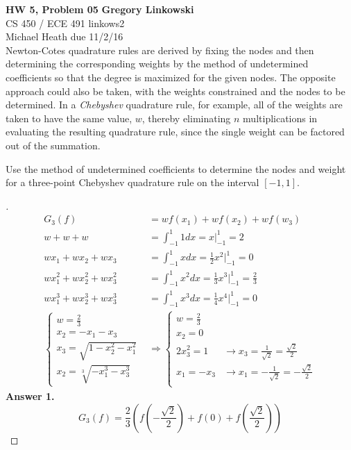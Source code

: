\documentclass[12pt]{article}
\newenvironment{exercise}[2][Exercise]{\begin{trivlist}
\item[\hskip \labelsep {\bfseries #1}\hskip \labelsep {\bfseries #2.}]}{\end{trivlist}}
\begin{document}
\noindent
\large\textbf{HW 5, Problem 05} \hfill \textbf{Gregory Linkowski} \\
\normalsize CS 450 / ECE 491 \hfill linkows2 \\
Michael Heath \hfill due 11/2/16 \\


\vspace{5mm}
Newton-Cotes quadrature rules are derived by fixing the nodes and then determining the corresponding weights by the method of undetermined coefficients so that the degree is maximized for the given nodes. The opposite approach could also be taken, with the weights constrained and the nodes to be determined. In a \textit{Chebyshev} quadrature rule, for example, all of the weights are taken to have the same value, $w$, thereby eliminating $n$ multiplications in evaluating the resulting quadrature rule, since the single weight can be factored out of the summation.
\vspace{-2mm} \\

\begin{exercise}{1}
	Use the method of undetermined coefficients to determine the nodes and weight for a three-point Chebyshev quadrature rule on the interval $[-1,1]$.
\end{exercise} \vspace{-10mm}
\begin{proof}[]
	\begin{align*}
		G_3(f) &= w f(x_1) + w f(x_2) + w f(w_3) \\[10pt]
		w + w + w &= \int_{-1}^{1} 1 dx = x|_{-1}^{1} = 2 \\
		w x_1 + w x_2 + w x_3 &= \int_{-1}^{1} x dx = \frac{1}{2}x^2|_{-1}^{1} = 0 \\
		w x_1^2 + w x_2^2 + w x_3^2 &= \int_{-1}^{1} x^2 dx = \frac{1}{3}x^3|_{-1}^{1} = \frac{2}{3} \\
		w x_1^3 + w x_2^3 + w x_3^3 &= \int_{-1}^{1} x^3 dx = \frac{1}{4}x^4|_{-1}^{1} = 0 \\[15pt]
		\begin{cases}
			w = \frac{2}{3} \\
			x_2 = - x_1 - x_3 \\
			x_3 = \sqrt{1 - x_2^2 - x_1^2} \\
			x_2 = \sqrt[3]{- x_1^3 - x_3^3}
		\end{cases}
		& \Rightarrow \begin{cases}
			w = \frac{2}{3} \\
			x_2 = 0 \\
			2 x_3^2 = 1 &\rightarrow x_3 = \frac{1}{\sqrt{2}} = \frac{\sqrt{2}}{2} \\
			x_1 = - x_3 &\rightarrow x_1 = -\frac{1}{\sqrt{2}} = -\frac{\sqrt{2}}{2}\\
		\end{cases}
	\end{align*}
	\textbf{Answer 1.} %
	\[ G_3(f) = \frac{2}{3} \left( f\left( -\frac{\sqrt{2}}{2}\right)  +  f(0) + f\left( \frac{\sqrt{2}}{2}\right) \right)   \]
\end{proof}
\end{document}

